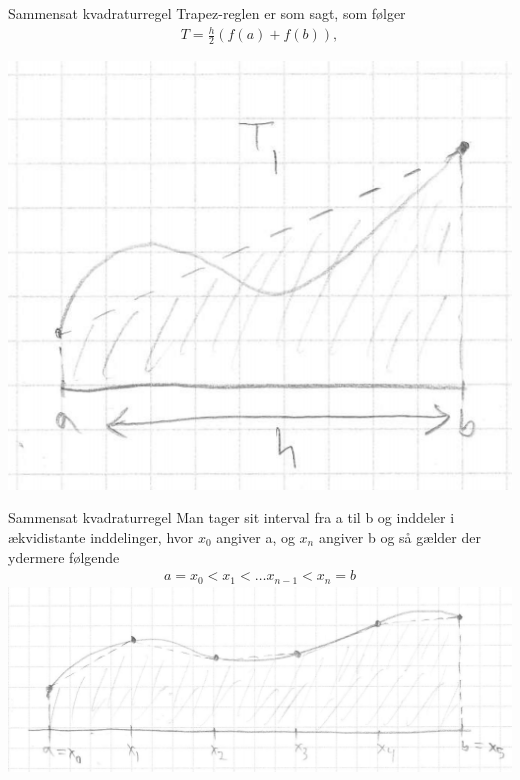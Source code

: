 \begin{frame}{Sammensat kvadraturregel}
Trapez-reglen er som sagt, som følger
    \begin{align*}
    T = \frac{h}{2}(f(a)+f(b)),
    \end{align*}
\begin{center}
\includegraphics[scale=0.4]{images/TRAPEZZI.png}
\end{center}
\end{frame}

\begin{frame}{Sammensat kvadraturregel}
Man tager sit interval fra a til b og inddeler i ækvidistante inddelinger, hvor $x_0$ angiver a, og $x_n$ angiver b og så gælder der ydermere følgende
    \begin{align*}
    a = x_0 < x_1 < … x_{n-1} < x_n = b
    \end{align*}
\includegraphics[scale=0.3]{images/TRAPEZSAM.png}
\end{frame}

